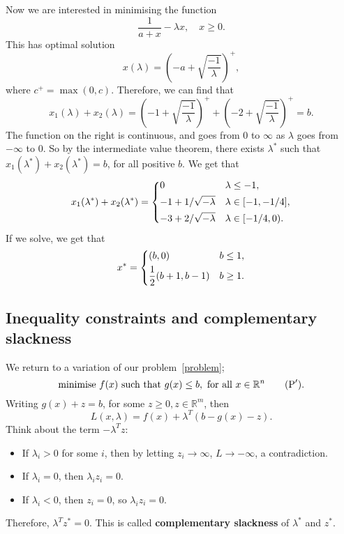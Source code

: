 \documentclass[12pt]{article}
\theoremstyle{definition}
\theoremstyle{remark}
\begin{document}
\begin{adjustbox}{minipage = \columnwidth - 25.5pt, margin=1em, frame=1pt, margin=0em}
Now we are interested in minimising the function
\[
\frac{1}{a + x} - \lambda x, \quad x \geq 0
.\]
This has optimal solution
\[
	x(\lambda) = \left( - a + \sqrt{\frac{-1}{\lambda}} \right)^{+}
,\]
where $c^{+} = \max(0, c)$. Therefore, we can find that
\[
	x_1(\lambda) + x_2(\lambda) = \left( -1 + \sqrt{ \frac{-1}{\lambda} } \right)^{+} + \left( -2 + \sqrt{ \frac{-1}{\lambda} } \right)^{+} = b
.\]
The function on the right is continuous, and goes from $0$ to $\infty$ as $\lambda$ goes from $-\infty$ to $0$. So by the intermediate value theorem, there exists $\lambda^{\ast}$ such that $x_1(\lambda^{\ast}) + x_2(\lambda^{\ast}) = b$, for all positive $b$. We get that
\[
	x_1(\lambda^{\ast}) + x_2(\lambda^{\ast}) =
	\begin{dcases}
		0 & \lambda \leq -1, \\
		-1 + 1/\sqrt{-\lambda} & \lambda \in [-1, -1/4], \\
			-3 + 2/\sqrt{-\lambda} & \lambda \in [-1/4, 0).
	\end{dcases}
\]
If we solve, we get that
\[
x^{\ast} =
\begin{dcases}
	(b, 0) & b \leq 1, \\
	\frac{1}{2} (b + 1, b - 1) & b \geq 1.
\end{dcases}
\]
\end{adjustbox}

\subsection{Inequality constraints and complementary slackness}%
\label{sub:inequality_constraints_and_complementary_slackness}

We return to a variation of our problem~\eqref{problem};
\[
	\text{minimise } f(x) \text{ such that } g(x) \leq b, \text{ for all } x \in \mathbb{R}^{n} \tag{$\text{P}'$}\label{problem'}
.\]
Writing $g(x) + z = b$, for some $z \geq 0, z \in \mathbb{R}^{m}$, then
\[
	L(x, \lambda) = f(x) + \lambda^{T}(b - g(x) - z)
.\]
Think about the term $-\lambda^{T}z$:
\begin{itemize}
	\item If $\lambda_i > 0$ for some $i$, then by letting $z_i \to \infty$, $L \to -\infty$, a contradiction.
	\item If $\lambda_i = 0$, then $\lambda_iz_i = 0$.
	\item If $\lambda_i < 0$, then $z_i = 0$, so $\lambda_i z_i = 0$.
\end{itemize}
Therefore, $\lambda^{T}z^{\ast} = 0$. This is called \textbf{complementary slackness} of $\lambda^{\ast}$ and $z^{\ast}$.
\end{document}
